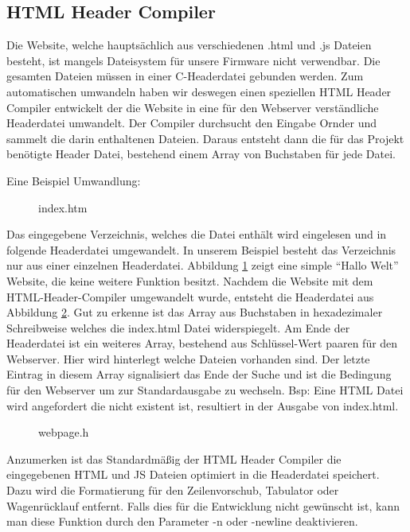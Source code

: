 \subsection{HTML Header Compiler}

Die Website, welche hauptsächlich aus verschiedenen .html und .js Dateien
besteht, ist mangels Dateisystem für unsere Firmware nicht verwendbar. Die
gesamten Dateien müssen in einer C-Headerdatei gebunden werden. Zum
automatischen umwandeln haben wir deswegen einen speziellen HTML Header Compiler
entwickelt der die Website in eine für den Webserver verständliche Headerdatei umwandelt.
Der Compiler durchsucht den Eingabe Ornder und sammelt die darin enthaltenen
Dateien. Daraus entsteht dann die für das Projekt benötigte Header Datei,
bestehend einem Array von Buchstaben für jede Datei.

Eine Beispiel Umwandlung:


\begin{figure}[H]

\caption{index.htm}
\label{input}
\end{figure}

Das eingegebene Verzeichnis, welches die Datei enthält wird eingelesen und in
folgende Headerdatei umgewandelt. In unserem Beispiel besteht das Verzeichnis
nur aus einer einzelnen Headerdatei.
Abbildung \ref{input} zeigt eine simple "`Hallo Welt"' Website, die keine
weitere Funktion besitzt. Nachdem die Website mit dem HTML-Header-Compiler
umgewandelt wurde, entsteht die Headerdatei aus Abbildung \ref{output}. Gut zu
erkenne ist das Array aus Buchstaben in hexadezimaler Schreibweise welches die
index.html Datei widerspiegelt.
Am Ende der Headerdatei ist ein weiteres Array, bestehend aus Schlüssel-Wert
paaren für den Webserver. Hier wird hinterlegt welche Dateien vorhanden sind.
Der letzte Eintrag in diesem Array signalisiert das Ende der Suche und ist die
Bedingung für den Webserver um zur Standardausgabe zu wechseln. Bsp: Eine HTML
Datei wird angefordert die nicht existent ist, resultiert in der Ausgabe von
index.html.

\begin{figure}[H]

\caption{webpage.h}
\label{output}
\end{figure}

Anzumerken ist das Standardmäßig der HTML Header Compiler die eingegebenen HTML
und JS Dateien optimiert in die Headerdatei speichert. Dazu wird die
Formatierung für den Zeilenvorschub, Tabulator oder Wagenrücklauf entfernt.
Falls dies für die Entwicklung nicht gewünscht ist, kann man diese Funktion
durch den Parameter \textrm{-n oder -newline} deaktivieren.






